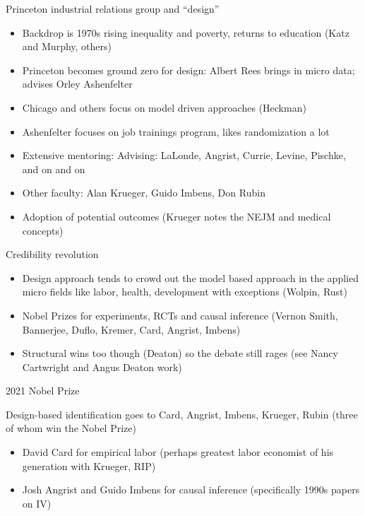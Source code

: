 \documentclass{beamer}
\begin{document}
\begin{frame}{Princeton industrial relations group and ``design''}

\begin{itemize}
\item Backdrop is 1970s rising inequality and poverty, returns to education (Katz and Murphy, others)
\item Princeton becomes ground zero for design: Albert Rees brings in micro data; advises Orley Ashenfelter
\item Chicago and others focus on model driven approaches (Heckman)
\item Ashenfelter focuses on job trainings program, likes randomization a lot
\item Extensive mentoring: Advising: LaLonde, Angrist, Currie, Levine, Pischke, and on and on
\item Other faculty: Alan Krueger, Guido Imbens, Don Rubin
\item Adoption of potential outcomes (Krueger notes the NEJM and medical concepts)
\end{itemize}

\end{frame}


\begin{frame}{Credibility revolution}

\begin{itemize}
\item Design approach tends to crowd out the model based approach in the applied micro fields like labor, health, development with exceptions (Wolpin, Rust)
\item Nobel Prizes for experiments, RCTs and causal inference (Vernon Smith, Bannerjee, Duflo, Kremer, Card, Angrist, Imbens)
\item Structural wins too though (Deaton) so the debate still rages (see Nancy Cartwright and Angus Deaton work)
\end{itemize}

\end{frame}


\begin{frame}{2021 Nobel Prize}

Design-based identification goes to Card, Angrist, Imbens, Krueger, Rubin (three of whom win the Nobel Prize)
\begin{itemize}
\item David Card for empirical labor (perhaps greatest labor economist of his generation with Krueger, RIP)
\item Josh Angrist and Guido Imbens for causal inference (specifically 1990s papers on IV)
\end{itemize}

\end{frame}
\end{document}

